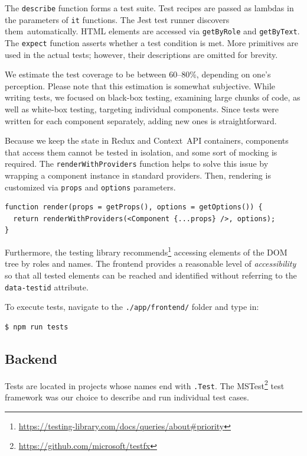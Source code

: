 The \texttt{describe} function forms a test suite. Test recipes are passed as lambdas in the parameters of \texttt{it} functions. The Jest test runner discovers them~automatically. HTML elements are accessed via \texttt{getByRole} and \texttt{getByText}. The \texttt{expect} function asserts whether a test condition is met. More primitives are used in the actual tests; however, their descriptions are omitted for brevity.

We estimate the test coverage to be between 60--80\%, depending on one's perception. Please note that this estimation is somewhat subjective. While writing tests, we focused on black-box testing, examining large chunks of code, as well as white-box testing, targeting individual components. Since tests were written for each component separately, adding new ones is straightforward.

Because we keep the state in Redux and Context~API containers, components that access them cannot be tested in isolation, and some sort of mocking is required. The \texttt{renderWithProviders} function helps to solve this issue by wrapping a component instance in standard providers. Then, rendering is customized via \texttt{props} and \texttt{options} parameters.

\begin{verbatim}
function render(props = getProps(), options = getOptions()) {
  return renderWithProviders(<Component {...props} />, options);
}
\end{verbatim}

Furthermore, the testing library recommends\footnote{\href{https://testing-library.com/docs/queries/about\#priority}{https://testing-library.com/docs/queries/about\#priority}} accessing elements of the DOM tree by roles and names. The frontend provides a reasonable level of \emph{accessibility} so that all tested elements can be reached and identified without referring to the \texttt{data-testid} attribute.

To execute tests, navigate to the \texttt{./app/frontend/} folder and type in:

\begin{verbatim}
$ npm run tests
\end{verbatim}

\subsection*{Backend}

Tests are located in projects whose names end with \texttt{.Test}. The MSTest\footnote{\href{https://github.com/microsoft/testfx}{https://github.com/microsoft/testfx}} test framework was our choice to describe and run individual test cases.

